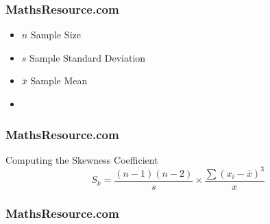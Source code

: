 \begin{frame}
	\frametitle{MathsResource.com}
	\Large
	
	\begin{itemize}
		\item $n$ Sample Size
		\item $s$ Sample Standard Deviation
		\item $\bar{x}$ Sample Mean
		\item
	\end{itemize}
	
\end{frame}
\begin{frame}
\frametitle{MathsResource.com}
\Large

Computing the Skewness Coefficient
{
\LARGE
\[S_k = \frac{(n-1)(n-2)}{s} \times \frac{ \sum(x_i - \bar{x})^3 }{ x} \] 
}

\end{frame}
\begin{frame}
\frametitle{MathsResource.com}
\Large

\end{frame}